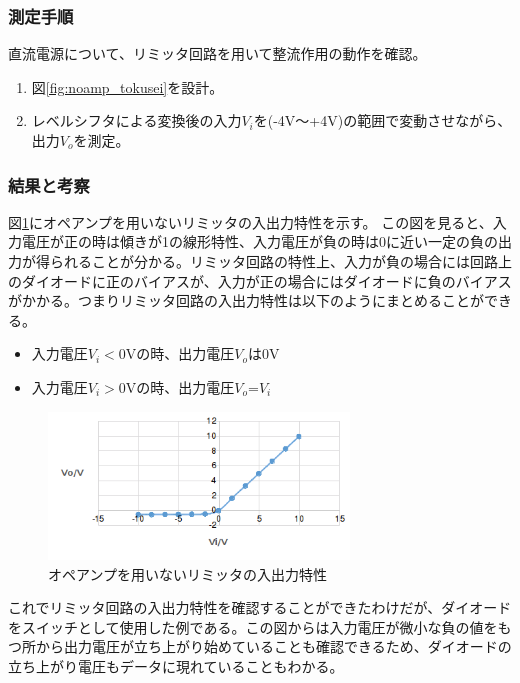 \documentclass[11pt,a4j]{jsarticle}
\begin{document}
   \subsubsection{測定手順}
    直流電源について、リミッタ回路を用いて整流作用の動作を確認。
    \begin{enumerate}
    \item 図\ref{fig:noamp_tokusei}を設計。
    \item レベルシフタによる変換後の入力$V_i$を(-4V～+4V)の範囲で変動させながら、出力$V_o$を測定。
    \end{enumerate}
    
   \subsubsection{結果と考察}
    図\ref{fig:1_1_noamp_PS}にオペアンプを用いないリミッタの入出力特性を示す。
    この図を見ると、入力電圧が正の時は傾きが1の線形特性、入力電圧が負の時は0に近い一定の負の出力が得られることが分かる。リミッタ回路の特性上、入力が負の場合には回路上のダイオードに正のバイアスが、入力が正の場合にはダイオードに負のバイアスがかかる。つまりリミッタ回路の入出力特性は以下のようにまとめることができる。
    \begin{itemize}
    \item 入力電圧$V_i < 0$Vの時、出力電圧$V_o$は0V
    \item 入力電圧$V_i > 0$Vの時、出力電圧$V_o$=$V_i$
    \end{itemize}
    
    
    \begin{figure}[htbp]
  \centering
  \includegraphics[width=8cm,clip]{1_1_noamp_PS.png}
  \caption{オペアンプを用いないリミッタの入出力特性}
  \label{fig:1_1_noamp_PS}
 \end{figure}%
    
    これでリミッタ回路の入出力特性を確認することができたわけだが、ダイオードをスイッチとして使用した例である。この図からは入力電圧が微小な負の値をもつ所から出力電圧が立ち上がり始めていることも確認できるため、ダイオードの立ち上がり電圧もデータに現れていることもわかる。
    
\end{document}
